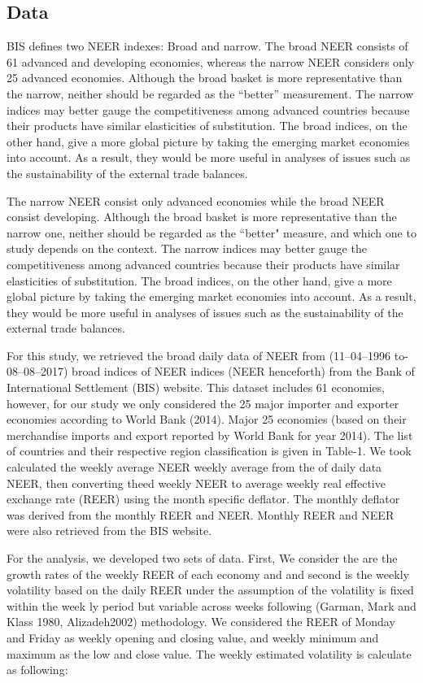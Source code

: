 \documentclass[]{elsarticle} %
\begin{document}
\subsection{Data}\label{data}

BIS defines two NEER indexes: Broad and narrow. The broad NEER consists
of 61 advanced and developing economies, whereas the narrow NEER
considers only 25 advanced economies. Although the broad basket is more
representative than the narrow, neither should be regarded as the
``better'' measurement. The narrow indices may better gauge the
competitiveness among advanced countries because their products have
similar elasticities of substitution. The broad indices, on the other
hand, give a more global picture by taking the emerging market economies
into account. As a result, they would be more useful in analyses of
issues such as the sustainability of the external trade balances.

The narrow NEER consist only advanced economies while the broad NEER
consist developing. Although the broad basket is more representative
than the narrow one, neither should be regarded as the ``better"
measure, and which one to study depends on the context. The narrow
indices may better gauge the competitiveness among advanced countries
because their products have similar elasticities of substitution. The
broad indices, on the other hand, give a more global picture by taking
the emerging market economies into account. As a result, they would be
more useful in analyses of issues such as the sustainability of the
external trade balances.

For this study, we retrieved the broad daily data of NEER from
(11--04--1996 to- 08--08--2017) broad indices of NEER indices (NEER
henceforth) from the Bank of International Settlement (BIS) website.
This dataset includes 61 economies, however, for our study we only
considered the 25 major importer and exporter economies according to
World Bank (2014). Major 25 economies (based on their merchandise
imports and export reported by World Bank for year 2014). The list of
countries and their respective region classification is given in
Table-1. We took calculated the weekly average NEER weekly average from
the of daily data NEER, then converting theed weekly NEER to average
weekly real effective exchange rate (REER) using the month specific
deflator. The monthly deflator was derived from the monthly REER and
NEER. Monthly REER and NEER were also retrieved from the BIS website.

For the analysis, we developed two sets of data. First, We consider the
are the growth rates of the weekly REER of each economy and and second
is the weekly volatility based on the daily REER under the assumption of
the volatility is fixed within the week ly period but variable across
weeks following (Garman, Mark and Klass 1980, Alizadeh2002) methodology.
We considered the REER of Monday and Friday as weekly opening and
closing value, and weekly minimum and maximum as the low and close
value. The weekly estimated volatility is calculate as following:
\end{document}
